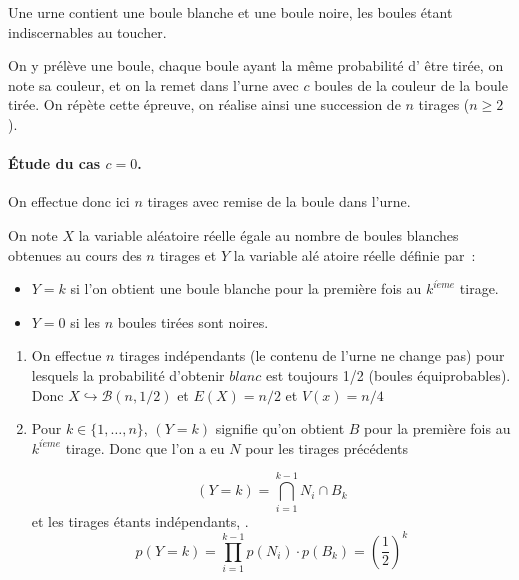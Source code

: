 \documentclass[a4paper, 11pt,reqno]{article}
\begin{document}
\begin{correction}


Une urne contient une boule blanche et une boule noire, les boules \'etant
indiscernables au toucher.

On y pr\'el\`eve une boule, chaque boule ayant la m\^{e}me probabilit\'e d'%
\^{e}tre tir\'ee, on note sa couleur, et on la remet dans l'urne avec $c$
boules de la couleur de la boule tir\'ee. On r\'ep\`ete cette \'epreuve, on
r\'ealise ainsi une succession de $n$ tirages ($n\geqslant 2$).

\paragraph{\'Etude du cas $c=0$.}

On effectue donc ici $n$ tirages avec remise de la boule dans l'urne.

On note $X$ la variable al\'{e}atoire r\'{e}elle \'{e}gale au nombre de
boules blanches obtenues au cours des $n$ tirages et $Y$ la variable al\'{e}%
atoire r\'{e}elle d\'{e}finie par~:

\begin{itemize}
\item $Y=k$ si l'on obtient une boule blanche pour la premi\`{e}re fois au $%
k^{i\grave{e}me}$ tirage.

\item $Y=0$ si les $n$ boules tir\'{e}es sont noires.
\end{itemize}

\begin{enumerate}
\item On effectue $n$ tirages ind\'{e}pendants (le contenu de l'urne ne
change pas) pour lesquels la probabilit\'{e} d'obtenir $blanc$ est toujours
1/2 (boules \'{e}quiprobables). Donc $X\hookrightarrow \mathcal{B}\left(
n,1/2\right) $ et $E\left( X\right) =n/2$ et $V\left( x\right) =n/4$

\item Pour $k\in \{1,\ldots ,n\}$, $\left( Y=k\right) $ signifie qu'on
obtient $B$ pour la premi\`{e}re fois au $k^{i\grave{e}me}$ tirage. Donc que
l'on a eu $N$ pour les tirages pr\'{e}c\'{e}dents

\begin{equation*}
\left( Y=k\right) =\bigcap_{i=1}^{k-1}N_{i}\cap B_{k}
\end{equation*}
et les tirages \'{e}tants ind\'{e}pendants, . 
\begin{equation*}
p\left( Y=k\right) =\prod_{i=1}^{k-1}p\left( N_{i}\right) \cdot p\left(
B_{k}\right) =\left( \frac{1}{2}\right) ^{k}
\end{equation*}


\end{enumerate}
\end{correction}
\end{document}
